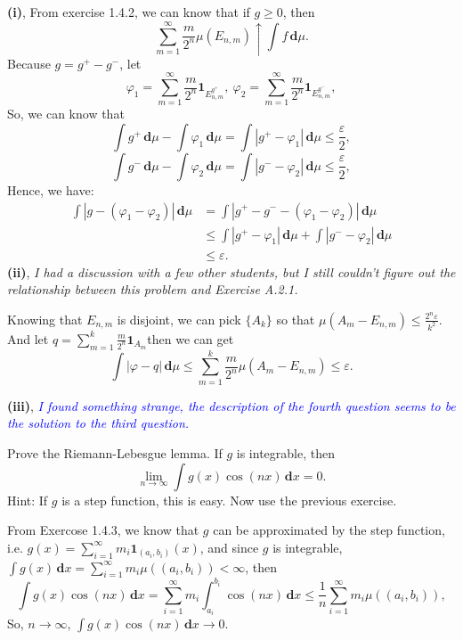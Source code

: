 \documentclass[en, normal, 11pt, black]{elegantnote}
\newenvironment{exercise}[1]{\begin{tcolorbox}[colback=black!15, colframe=black!80, breakable, title=#1]}{\end{tcolorbox}}
\renewenvironment{proof}{\begin{tcolorbox}[colback=white, colframe=black!50, breakable, title=Proof. ]\setlength{\parskip}{0.8em}}{\\\rightline{$\square$}\end{tcolorbox}}
\newenvironment{solution}{\begin{tcolorbox}[colback=white, colframe=black!50, breakable, title=Solution. ]\setlength{\parskip}{0.8em}}{\end{tcolorbox}}
\newcommand{\der}{\,\mathbf{d}}
\begin{document}
    \begin{solution}
        {\large\bf(i)}, From exercise 1.4.2, we can know that if $g\geqslant0$, then 
        \[
            \sum_{m=1}^{\infty} \frac{m}{2^{n}} \mu\left(E_{n, m}\right) \uparrow \int f \der \mu. 
        \]
        Because $g=g^+-g^-$, let 
        \[
            \varphi_1=\sum_{m=1}^\infty\frac{m}{2^n}\mathbf{1}_{E_{n,m}^{g^+}},\ \varphi_2=\sum_{m=1}^\infty\frac{m}{2^n}\mathbf{1}_{E_{n,m}^{g^-}}, 
        \]
        So, we can know that 
        \[\int g^+\der\mu-\int \varphi_1\der\mu=\int|g^+-\varphi_1|\der\mu\leqslant\frac{\varepsilon}{2}, \]
        \[\int g^-\der\mu-\int \varphi_2\der\mu=\int|g^--\varphi_2|\der\mu\leqslant\frac{\varepsilon}{2}, \]
        Hence, we have: 
        \begin{align*}
            \int |g-(\varphi_1-\varphi_2)|\der \mu&=\int |g^+-g^--(\varphi_1-\varphi_2)|\der \mu\\
            &\leqslant\int|g^+-\varphi_1|\der \mu + \int |g^--\varphi_2|\der \mu\\
            &\leqslant\varepsilon. 
        \end{align*}
        {\large\bf(ii)}, \emph{I had a discussion with a few other students, but I still couldn't figure out the relationship between this problem and Exercise A.2.1. }
        
        Knowing that $E_{n,m}$ is disjoint, we can pick $\{A_k\}$ so that $\mu(A_m-E_{n,m})\leqslant\frac{2^n\varepsilon}{k^2}$. And let $q=\sum_{m=1}^k\frac{m}{2^n}\mathbf{1}_{A_m}$then we can get 
        \[\int|\varphi-q|\der\mu\leqslant\sum_{m=1}^k\frac{m}{2^n}\mu(A_m-E_{n,m})\leqslant\varepsilon. \]

        {\large\bf(iii)}, \textcolor{blue}{\emph{I found something strange, the description of the fourth question seems to be the solution to the third question. }}
    \end{solution}
    

    \begin{exercise}{1.4.4}
        Prove the Riemann-Lebesgue lemma. If $g$ is integrable, then 
        \[
            \lim _{n \rightarrow \infty} \int g(x) \cos(nx) \der x=0. 
        \]
        Hint: If $g$ is a step function, this is easy. Now use the previous exercise. 
    \end{exercise}

    \begin{proof}
        From Exercose 1.4.3, we know that $g$ can be approximated by the step function, i.e. $g(x)=\sum_{i=1}^\infty m_i \mathbf{1}_{(a_i, b_i)}(x)$, and since $g$ is integrable, $\int g(x)\der x=\sum_{i=1}^\infty m_i\mu((a_i,b_i))<\infty$, then 
        \[
            \int g(x) \cos (n x )\der x=\sum_{i=1}^\infty m_i \int_{a_i}^{b_i} \cos (n x) \der x\leqslant\frac{1}{n}\sum_{i=1}^\infty m_i\mu((a_i,b_i)), 
        \]
        So, $n\to \infty$, $\int g(x) \cos (n x )\der x\rightarrow 0$. 
    \end{proof}
\end{document}
